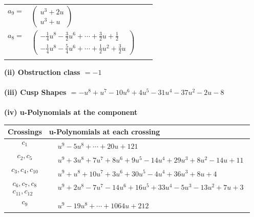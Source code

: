\documentclass[1p]{elsarticle_modified}
\theoremstyle{definition}
\begin{document}
\begin{tabular}{m{7pt} m{180pt} m{7pt} m{180pt} }
\flushright $a_{9}=$&$\begin{pmatrix}u^3+2 u\\u^3+u\end{pmatrix}$ \\
\flushright $a_{8}=$&$\begin{pmatrix}-\frac{1}{4} u^8-\frac{3}{2} u^6+\cdots+\frac{3}{2} u+\frac{1}{2}\\-\frac{1}{4} u^8-\frac{5}{4} u^6+\cdots+\frac{1}{2} u^2+\frac{3}{2} u\end{pmatrix}$\\&\end{tabular}
\flushleft \textbf{(ii) Obstruction class $= -1$}\\~\\
\flushleft \textbf{(iii) Cusp Shapes $= - u^8+u^7-10 u^6+4 u^5-31 u^4-37 u^2-2 u-8$}\\~\\
\newpage\renewcommand{\arraystretch}{1}
\flushleft \textbf{(iv) u-Polynomials at the component}\newline \\
\begin{tabular}{m{50pt}|m{274pt}}
Crossings & \hspace{64pt}u-Polynomials at each crossing \\
\hline $$\begin{aligned}c_{1}\end{aligned}$$&$\begin{aligned}
&u^9-5 u^8+\cdots+20 u+121
\end{aligned}$\\
\hline $$\begin{aligned}c_{2},c_{5}\end{aligned}$$&$\begin{aligned}
&u^9+3 u^8+7 u^7+8 u^6+9 u^5-14 u^4+29 u^3+8 u^2-14 u+11
\end{aligned}$\\
\hline $$\begin{aligned}c_{3},c_{4},c_{10}\end{aligned}$$&$\begin{aligned}
&u^9+u^8+10 u^7+3 u^6+30 u^5-4 u^4+36 u^3+8 u+4
\end{aligned}$\\
\hline $$\begin{aligned}c_{6},c_{7},c_{8}\\c_{11},c_{12}\end{aligned}$$&$\begin{aligned}
&u^9+2 u^8-7 u^7-14 u^6+16 u^5+33 u^4-5 u^3-13 u^2+7 u+3
\end{aligned}$\\
\hline $$\begin{aligned}c_{9}\end{aligned}$$&$\begin{aligned}
&u^9-19 u^8+\cdots+1064 u+212
\end{aligned}$\\
\hline
\end{tabular}\\~\\
\end{document}
